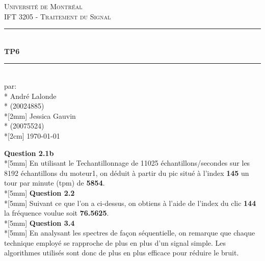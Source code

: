 \documentclass[11pt, letterpaper]{article}
\begin{document}
\begin{titlepage}
	\center
	
	\vspace*{2cm}
	
	\textsc{\LARGE Université de Montréal}\\[1cm] 
	\textsc{\Large IFT 3205 - Traitement du Signal}\\[1.5cm] 
	
	\rule{\linewidth}{0.5mm} \\[0.5cm]
	{\LARGE \bfseries TP6} \\[0.2cm] %
	\rule{\linewidth}{0.5mm} \\[3cm]
	
	\large par: \\*
	André Lalonde \\*
	(20024885) \\*[2mm]
	Jessica Gauvin \\*
	(20075524) \\*[2cm]
	{\large \today}\\[3cm]
	
	\vfill
\end{titlepage}
\newpage
\flushleft
\par{\textbf{Question 2.1b} \\*[5mm]
En utilisant le Techantillonnage de 11025 échantillons/secondes sur les 8192 échantillons du moteur1, on déduit à partir du pic situé à l'index \textbf{145} un tour par minute (tpm) de \textbf{5854}. \\*[5mm]
\textbf{Question 2.2} \\*[5mm]
Suivant ce que l'on a ci-dessus, on obtiens à l'aide de l'index du clic \textbf{144} la fréquence voulue soit \textbf{76.5625}. \\*[5mm]
\textbf{Question 3.4} \\*[5mm]
En analysant les spectres de façon séquentielle, on remarque que chaque technique employé se rapproche de plus en plus d'un signal simple. Les algorithmes utilisés sont donc de plus en plus efficace pour réduire le bruit.
}
\end{document}
